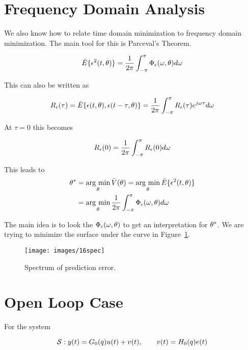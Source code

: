 \section{Frequency Domain Analysis}
We also know how to relate time domain minimization to frequency domain minimization.
The main tool for this is Parceval's Theorem.
\begin{theorem}

\begin{equation*}
\bar{E}\{\epsilon^2(t,\theta)\} = \frac{1}{2\pi}\int_{-\pi}^\pi \Phi_\epsilon(\omega,\theta)d\omega
\end{equation*}

\end{theorem}
This can also be written as

\begin{equation*}
R_\epsilon(\tau) = \bar{E}\{\epsilon(t,\theta),\epsilon(t-\tau,\theta)\} = \frac{1}{2\pi}\int_{-\pi}^\pi R_\epsilon(\tau)e^{j\omega\tau}d\omega
\end{equation*}

At $\tau=0$ this becomes

\begin{equation*}
R_\epsilon(0) = \frac{1}{2\pi}\int_{-\pi}^\pi R_\epsilon(0)d\omega
\end{equation*}

This leads to
\begin{align*}
\theta^\ast &= \mathop{\arg\,\min}\limits_\theta\bar{V}(\theta) = \mathop{\arg\,\min}\limits_\theta\bar{E}\{\epsilon^2(t,\theta)\} \\
&= \mathop{\arg\,\min}\limits_\theta\frac{1}{2\pi}\int_{-\pi}^\pi \Phi_\epsilon(\omega,\theta)d\omega
\end{align*}

The main idea is to look the $\Phi_\epsilon(\omega,\theta)$ to get an interpretation for $\theta^\ast$.
We are trying to minimize the surface under the curve in Figure~\ref{fig:16spec}.

\begin{figure}[ht!]
\centering
\texttt{[image: images/16spec]}
\caption{Spectrum of prediction error.}%
\label{fig:16spec}
\end{figure}

\section{Open Loop Case}
For the system

\begin{equation*}
\mathcal{S}: y(t) = G_0(q) u(t) + v(t), \qquad v(t) = H_0(q) e(t)
\end{equation*}

